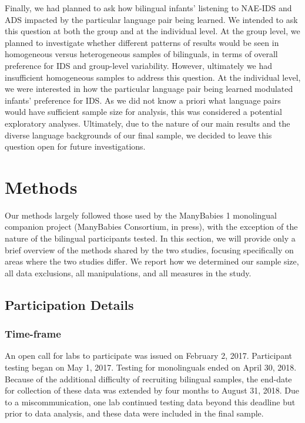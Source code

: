 \documentclass[english,,man,floatsintext]{apa6}
\begin{document}
\begin{enumerate}
  Finally, we had planned to ask how bilingual infants' listening to NAE-IDS and ADS impacted by the particular language pair being learned. We intended to ask this question at both the group and at the individual level. At the group level, we planned to investigate whether different patterns of results would be seen in homogeneous versus heterogeneous samples of bilinguals, in terms of overall preference for IDS and group-level variability. However, ultimately we had insufficient homogeneous samples to address this question. At the individual level, we were interested in how the particular language pair being learned modulated infants' preference for IDS. As we did not know a priori what language pairs would have sufficient sample size for analysis, this was considered a potential exploratory analyses. Ultimately, due to the nature of our main results and the diverse language backgrounds of our final sample, we decided to leave this question open for future investigations.
\end{enumerate}

\hypertarget{methods}{%
\section{Methods}\label{methods}}

Our methods largely followed those used by the ManyBabies 1 monolingual companion project (ManyBabies Consortium, in press), with the exception of the nature of the bilingual participants tested. In this section, we will provide only a brief overview of the methods shared by the two studies, focusing specifically on areas where the two studies differ. We report how we determined our sample size, all data exclusions, all manipulations, and all measures in the study.

\hypertarget{participation-details}{%
\subsection{Participation Details}\label{participation-details}}

\hypertarget{time-frame}{%
\subsubsection{Time-frame}\label{time-frame}}

An open call for labs to participate was issued on February 2, 2017. Participant testing began on May 1, 2017. Testing for monolinguals ended on April 30, 2018. Because of the additional difficulty of recruiting bilingual samples, the end-date for collection of these data was extended by four months to August 31, 2018. Due to a miscommunication, one lab continued testing data beyond this deadline but prior to data analysis, and these data were included in the final sample.
\end{document}
